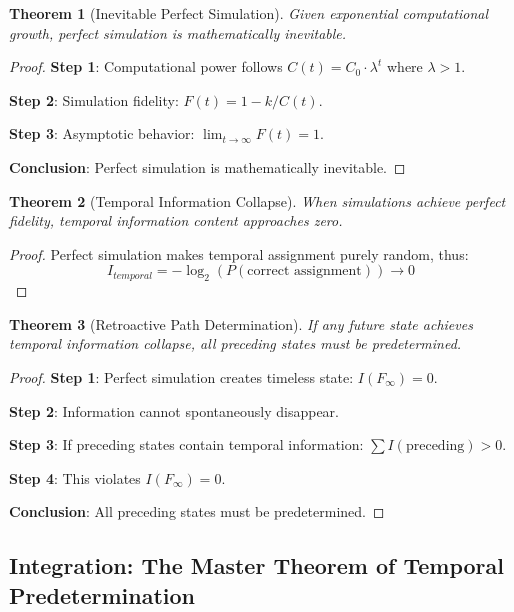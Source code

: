 \documentclass[11pt]{article}
\newtheorem{theorem}{Theorem}[section]
\theoremstyle{remark}
\begin{document}
\begin{theorem}[Inevitable Perfect Simulation]
Given exponential computational growth, perfect simulation is mathematically inevitable.
\end{theorem}

\begin{proof}
\textbf{Step 1}: Computational power follows $C(t) = C_0 \cdot \lambda^t$ where $\lambda > 1$.

\textbf{Step 2}: Simulation fidelity: $F(t) = 1 - k/C(t)$.

\textbf{Step 3}: Asymptotic behavior: $\lim_{t \to \infty} F(t) = 1$.

\textbf{Conclusion}: Perfect simulation is mathematically inevitable.
\end{proof}

\begin{theorem}[Temporal Information Collapse]
When simulations achieve perfect fidelity, temporal information content approaches zero.
\end{theorem}

\begin{proof}
Perfect simulation makes temporal assignment purely random, thus:
$$I_{temporal} = -\log_2(P(\text{correct assignment})) \to 0$$
\end{proof}

\begin{theorem}[Retroactive Path Determination]
If any future state achieves temporal information collapse, all preceding states must be predetermined.
\end{theorem}

\begin{proof}
\textbf{Step 1}: Perfect simulation creates timeless state: $I(F_\infty) = 0$.

\textbf{Step 2}: Information cannot spontaneously disappear.

\textbf{Step 3}: If preceding states contain temporal information: $\sum I(\text{preceding}) > 0$.

\textbf{Step 4}: This violates $I(F_\infty) = 0$.

\textbf{Conclusion}: All preceding states must be predetermined.
\end{proof}

\subsection{Integration: The Master Theorem of Temporal Predetermination}
\end{document}
